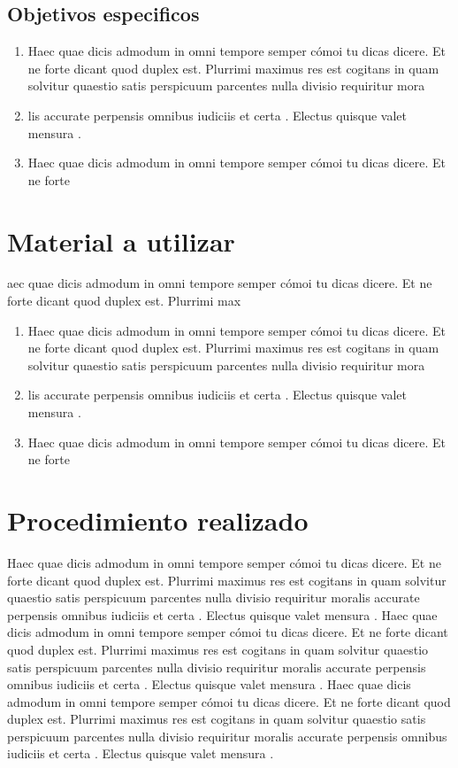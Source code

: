 \documentclass[10pt]{article}
\begin{document}
\subsection{Objetivos especificos}
\begin{enumerate}
    \item Haec quae dicis admodum in omni tempore semper cómoi tu dicas dicere. Et ne forte dicant quod duplex est. Plurrimi maximus res est cogitans in quam solvitur quaestio satis perspicuum parcentes nulla divisio requiritur mora
    \item lis accurate perpensis omnibus iudiciis et certa . Electus quisque valet mensura .
    \item Haec quae dicis admodum in omni tempore semper cómoi tu dicas dicere. Et ne forte 

\end{enumerate}


\section{Material a utilizar}
aec quae dicis admodum in omni tempore semper cómoi tu dicas dicere. Et ne forte dicant quod duplex est. Plurrimi max
   \begin{enumerate}
    \item Haec quae dicis admodum in omni tempore semper cómoi tu dicas dicere. Et ne forte dicant quod duplex est. Plurrimi maximus res est cogitans in quam solvitur quaestio satis perspicuum parcentes nulla divisio requiritur mora
    \item lis accurate perpensis omnibus iudiciis et certa . Electus quisque valet mensura .
    \item Haec quae dicis admodum in omni tempore semper cómoi tu dicas dicere. Et ne forte 
   \end{enumerate}

\section{Procedimiento realizado}

Haec quae dicis admodum in omni tempore semper cómoi tu dicas dicere. Et ne forte dicant quod duplex est. Plurrimi maximus res est cogitans in quam solvitur quaestio satis perspicuum parcentes nulla divisio requiritur moralis accurate perpensis omnibus iudiciis et certa . Electus quisque valet mensura .
Haec quae dicis admodum in omni tempore semper cómoi tu dicas dicere. Et ne forte dicant quod duplex est. Plurrimi maximus res est cogitans in quam solvitur quaestio satis perspicuum parcentes nulla divisio requiritur moralis accurate perpensis omnibus iudiciis et certa . Electus quisque valet mensura .
Haec quae dicis admodum in omni tempore semper cómoi tu dicas dicere. Et ne forte dicant quod duplex est. Plurrimi maximus res est cogitans in quam solvitur quaestio satis perspicuum parcentes nulla divisio requiritur moralis accurate perpensis omnibus iudiciis et certa . Electus quisque valet mensura .
\end{document}
